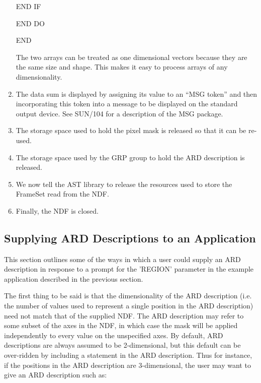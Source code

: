 \documentclass[11pt]{starlink}
\begin{document}
\begin{enumerate}
\begin{terminalv}
         END IF

      END DO

      END
\end{terminalv}
\normalsize

The two arrays can be treated as one dimensional vectors because they are the
same size and shape. This makes it easy to process arrays of any dimensionality.


\item The data sum is displayed by assigning its value to an ``MSG token'' and
then incorporating this token into a message to be displayed on the standard
output device. See SUN/104 for a description of the MSG package.

\item The storage space used to hold the pixel mask is released so that it can
be re-used.

\item The storage space used by the GRP group to hold the ARD description is
released.

\item We now tell the AST library to release the resources used to store
the FrameSet read from the NDF.

\item Finally, the NDF is closed.
\end{enumerate}

\subsection{Supplying ARD Descriptions to an Application}
This section outlines some of the ways in which a user could supply an ARD
description in response to a prompt for the 'REGION' parameter in the example
application described in the previous section.

The first thing to be said is that the dimensionality of the ARD
description (i.e. the number of values used to represent a single
position in the ARD description) need not match that of the supplied NDF.
The ARD description may refer to some subset of the axes in the NDF, in
which case the mask will be applied independently to every value on the
unspecified axes. By default, ARD descriptions are always assumed to be
2-dimensional, but this default can be over-ridden by including a
 statement in the ARD description. Thus for
instance, if the positions in the ARD description are 3-dimensional, the user
may want to give an ARD description such as:
\end{document}

